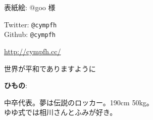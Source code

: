 \vspace*{40mm}
\begin{minipage}{0.8\paperwidth}
    表紙絵: @goo 様
\end{minipage}

\vspace*{20mm}
\begin{minipage}{0.8\paperwidth}
    Twitter: {\tt @cympfh}\\
    Github: {\tt @cympfh}

    {\url{http://cympfh.cc/}}

    世界が平和でありますように
\end{minipage}

\vspace*{20mm}
\begin{minipage}{0.8\paperwidth}
    {\bf ひもの}:

    中卒代表。夢は伝説のロッカー。190cm 50kg。\\
    ゆゆ式では相川さんとふみが好き。
\end{minipage}
